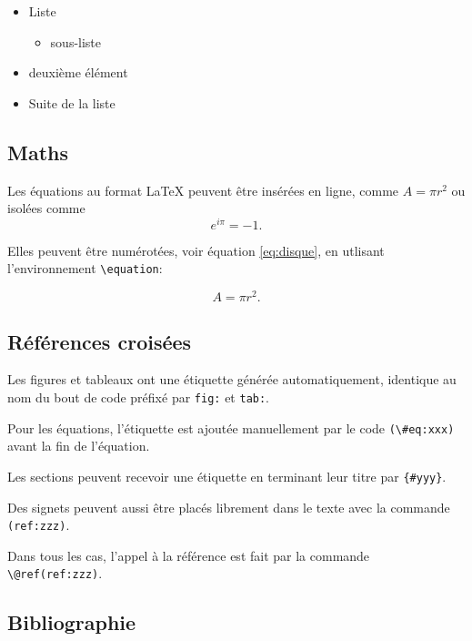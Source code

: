 \documentclass[fleqn,10pt]{ArtEcoFoG} %
\providecommand{\tightlist}{%
  \setlength{\itemsep}{0pt}\setlength{\parskip}{0pt}}
\begin{document}
\begin{itemize}
\item
  Liste

  \begin{itemize}
  \tightlist
  \item
    sous-liste
  \end{itemize}
\item
  deuxième élément
\item
  Suite de la liste
\end{itemize}

\hypertarget{maths}{%
\subsection{Maths}\label{maths}}

Les équations au format LaTeX peuvent être insérées en ligne, comme \(A=\pi r^2\) ou isolées comme \[e^{i \pi} = -1.\]

Elles peuvent être numérotées, voir équation \eqref{eq:disque}, en utlisant l'environnement \texttt{\textbackslash{}equation}:

\begin{equation}
A = \pi r^2.
\label{eq:disque}
\end{equation}

\hypertarget{ruxe9fuxe9rences-croisuxe9es}{%
\subsection{Références croisées}\label{ruxe9fuxe9rences-croisuxe9es}}

Les figures et tableaux ont une étiquette générée automatiquement, identique au nom du bout de code préfixé par \texttt{fig:} et \texttt{tab:}.

Pour les équations, l'étiquette est ajoutée manuellement par le code \texttt{(\textbackslash{}\#eq:xxx)} avant la fin de l'équation.

Les sections peuvent recevoir une étiquette en terminant leur titre par \texttt{\{\#yyy\}}.

Des signets peuvent aussi être placés librement dans le texte avec la commande \texttt{(ref:zzz)}.

Dans tous les cas, l'appel à la référence est fait par la commande \texttt{\textbackslash{}@ref(ref:zzz)}.

\hypertarget{bibliographie}{%
\subsection{Bibliographie}\label{bibliographie}}
\end{document}
